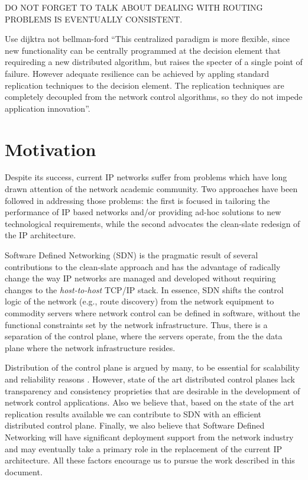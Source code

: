 DO NOT FORGET TO TALK ABOUT DEALING WITH ROUTING PROBLEMS IS EVENTUALLY CONSISTENT. 


Use dijktra not bellman-ford 
``This centralized paradigm is more flexible, since new functionality can be centrally programmed at the decision element that requireding a new distributed algorithm, but raises the specter of a single point of failure. However adequate resilience can be achieved by appling standard replication techniques to the decision element. The replication techniques are completely decoupled from the network control algorithms, so they do not impede application innovation''. 


\section{Motivation}
Despite its success, current IP networks suffer from problems 
which have long drawn attention of the network academic community. Two  approaches have been followed in addressing those problems: the first is focused in tailoring the performance of IP based networks and/or providing ad-hoc solutions to new technological requirements, while the second  advocates the clean-slate redesign of the IP architecture. 

Software Defined Networking (SDN) \cite{ONF:2012ui} is the pragmatic result of several contributions to the clean-slate approach and has the advantage of radically change the way IP networks are managed and developed without requiring changes to the \emph{host-to-host} TCP/IP stack. In essence, SDN shifts the control logic of the network (e.g., route discovery) from the network equipment to commodity servers where network control can  be defined in software, without the functional constraints set by the network infrastructure. Thus, there is a separation of the control plane, where the servers operate, from the the data plane where the network infrastructure resides. 

Distribution of the control plane is argued by many, to be essential for scalability and reliability reasons \cite{Tootoonchian:2010vy, Koponen:2010th,Yeganeh:2012jm,:zr}. However, state of the art  distributed control planes lack transparency and consistency proprieties that are desirable in the development of network control applications. 
Also we believe that, based on the state of the art replication results available \cite{Rao:2011vz,Lee:1996jm,Bolosky:2011ve,Wang:2012tj} we can contribute to SDN with an efficient distributed control plane.
Finally, we also believe that Software Defined Networking will have significant deployment support from the network industry and may eventually take a primary role in the replacement of the current IP architecture. 
All these factors  encourage us to pursue the work described in this document.



